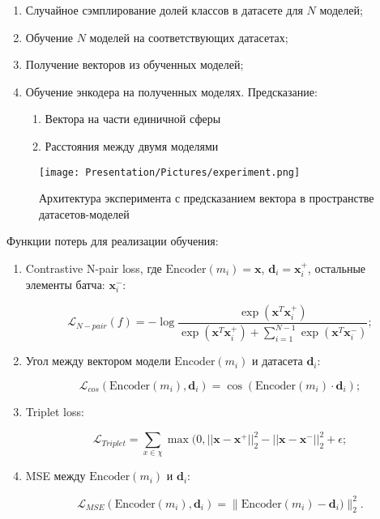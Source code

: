 \documentclass[a4paper, 14pt]{article}
\begin{document}
\begin{enumerate}
    \item Случайное сэмплирование долей классов в датасете для $N$ моделей;

    \item Обучение $N$ моделей на соответствующих датасетах;

    \item Получение векторов из обученных моделей;

    \item Обучение энкодера на полученных моделях. Предсказание:
        \begin{enumerate}
            \item Вектора на части единичной сферы

            \item Расстояния между двумя моделями
        \end{enumerate}
\end{enumerate}

\begin{figure}{}
    \texttt{[image: Presentation/Pictures/experiment.png]}
    \caption{Архитектура эксперимента с предсказанием вектора в пространстве датасетов-моделей}
    \label{fg:model_2}
\end{figure}

Функции потерь для реализации обучения:

\begin{enumerate}
    \item Contrastive N-pair loss, где $\text{Encoder}(m_i) = \textbf{x}$, $\textbf{d}_i = \textbf{x}_i^+$, остальные элементы батча: $\textbf{x}_i^-$:

\[\mathcal{L}_{N-pair}(f) = - \log \frac{\exp(\textbf{x}^T \textbf{x}_i^+)}{\exp(\textbf{x}^T \textbf{x}_i^+) + \sum _{i=1}^{N-1} \exp(\textbf{x}^T\textbf{x}_i^-)};\]
    \item Угол между вектором модели $\text{Encoder}(m_i)$ и датасета $\textbf{d}_i$:

\[\mathcal{L}_{cos}(\text{Encoder}(m_i), \textbf{d}_i) = \cos(\text{Encoder}(m_i) \cdot \textbf{d}_i);\]

    \item Triplet loss:

\[\mathcal{L}_{Triplet} = \sum\limits_{x \in \chi}\max(0, ||\textbf{x} - \textbf{x}^+||_2^2 - ||\textbf{x} - \textbf{x}^-||_2^2 + \epsilon;\]

    \item MSE между $\text{Encoder}(m_i)$ и $\textbf{d}_i$:

\[\mathcal{L}_{MSE}(\text{Encoder}(m_i), \textbf{d}_i) = \|\text{Encoder}(m_i) - \textbf{d}_i)\|_2^2.\]
\end{enumerate}

\newpage


\end{document}
